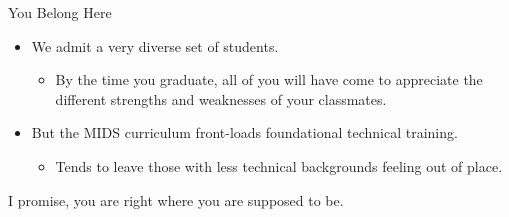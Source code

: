 \documentclass[11pt]{beamer}
\begin{document}
\begin{frame}[c]{You Belong Here}
	\begin{itemize}
		\item We admit a very diverse set of students. 
		\begin{itemize}
			\pause \item By the time you graduate, all of you will have come to appreciate the different strengths and weaknesses of your classmates. 
		\end{itemize}
		\pause \item But the MIDS curriculum front-loads foundational technical training.
		\begin{itemize}
			\pause \item Tends to leave those with less technical backgrounds feeling out of place.
		\end{itemize}
	\end{itemize}
	\pause \alert{I promise, you are right where you are supposed to be.}
\end{frame}
\end{document}
